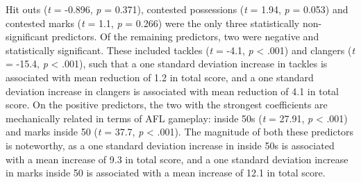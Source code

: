 \documentclass{article}
\begin{document}
Hit outs (\emph{t} = -0.896, \emph{p} = 0.371), contested possessions
(\emph{t} = 1.94, \emph{p} = 0.053) and contested marks (\emph{t} = 1.1,
\emph{p} = 0.266) were the only three statistically non-significant
predictors. Of the remaining predictors, two were negative and
statistically significant. These included tackles (\emph{t} = -4.1,
\emph{p} \textless{} .001) and clangers (\emph{t} = -15.4, \emph{p}
\textless{} .001), such that a one standard deviation increase in
tackles is associated with mean reduction of 1.2 in total score, and a
one standard deviation increase in clangers is associated with mean
reduction of 4.1 in total score. On the positive predictors, the two
with the strongest coefficients are mechanically related in terms of AFL
gameplay: inside 50s (\emph{t} = 27.91, \emph{p} \textless{} .001) and
marks inside 50 (\emph{t} = 37.7, \emph{p} \textless{} .001). The
magnitude of both these predictors is noteworthy, as a one standard
deviation increase in inside 50s is associated with a mean increase of
9.3 in total score, and a one standard deviation increase in marks
inside 50 is associated with a mean increase of 12.1 in total score.
\end{document}
